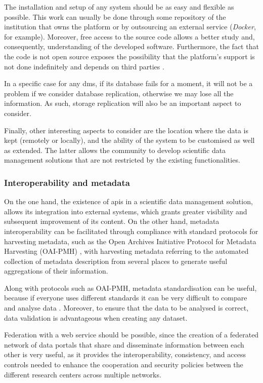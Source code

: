 The installation and setup of any system should be as easy and flexible as possible. This work can usually be done through some repository of the institution that owns the platform or by outsourcing an external service (\textit{Docker}, for example). Moreover, free access to the source code allows a better study and, consequently, understanding of the developed software. Furthermore, the fact that the code is not open source exposes the possibility that the platform's support is not done indefinitely and depends on third parties \citep{1}.
	
In a specific case for any \gls{dms}, if its database fails for a moment, it will not be a problem if we consider database replication, otherwise we may lose all the information. As such, storage replication will also be an important aspect to consider.
	
Finally, other interesting aspects to consider are the location where the data is kept (remotely or locally), and the ability of the system to be customised as well as extended. The latter allows the community to develop scientific data management solutions that are not restricted by the existing functionalities.
	    
\subsubsection{Interoperability and metadata}
    
On the one hand, the existence of \gls{api}s in a scientific data management solution, allows its integration into external systems, which grants greater visibility and subsequent improvement of its content. On the other hand, metadata interoperability can be facilitated through compliance with standard protocols for harvesting metadata, such as the Open Archives Initiative Protocol for Metadata Harvesting (OAI-PMH) \citep{1}, with harvesting metadata referring to the automated collection of metadata description from several places to generate useful aggregations of their information. 
    
Along with protocols such as OAI-PMH, metadata standardisation can be useful, because if everyone uses different standards it can be very difficult to compare and analyse data \citep{7}. Moreover, to ensure that the data to be analysed is correct, data validation is advantageous when creating any dataset.
    
Federation with a web service should be possible, since the creation of a federated network of data portals that share and disseminate information between each other is very useful, as it provides the interoperability, consistency, and access controls needed to enhance the cooperation and security policies between the different research centers across multiple networks.    
    
